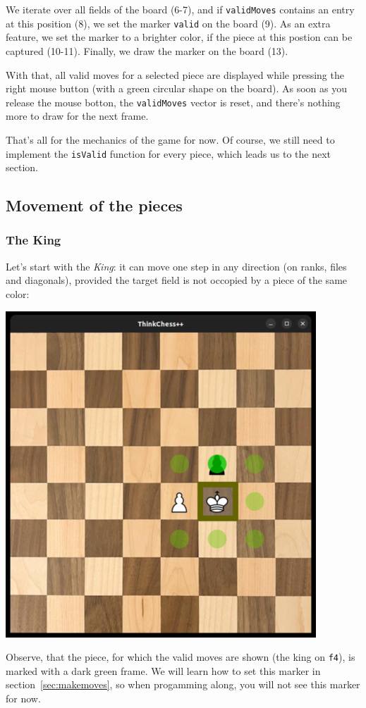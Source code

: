 We iterate over all fields of the board (6-7), and if \texttt{validMoves} contains
an entry at this position (8), we set the marker \texttt{valid} on the board (9).
As an extra feature, we set the marker to a brighter color, if the piece at this postion can be
captured (10-11).
Finally, we draw the marker on the board (13).

With that, all valid moves for a selected piece are displayed while pressing the right mouse button
(with a green circular shape on the board). As soon as you release the mouse botton, the
\texttt{validMoves} vector is reset, and there's nothing more to draw for the next frame.

That's all for the mechanics of the game for now. Of course, we still need to implement the
\texttt{isValid} function for every piece, which leads us to the next section.

\subsection{Movement of the pieces}\label{subsec:validmoves}
\subsubsection{The King}

Let's start with the \emph{King}: it can move one step in any direction (on ranks, files and
diagonals), provided the target field is not occopied by a piece of the same color:

\begin{center}
\includegraphics[width=.5\linewidth]{img/king.jpg}
\end{center}

Observe, that the piece, for which the valid moves are shown (the king on \texttt{f4}), is marked
with a dark green frame.
We will learn how to set this marker in section~\ref{sec:makemoves}, so when progamming along,
you will not see this marker for now.

